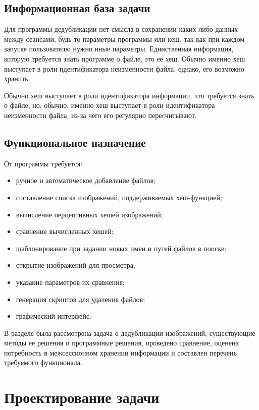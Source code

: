 \documentclass[variant=courcework]{bsuir}
\begin{document}

\section{Информационная база задачи}

Для программы дедубликации нет смысла в сохранении каких либо данных между
сеансами, будь то параметры программы или кеш, так как при каждом запуске
пользователю нужно иные параметры. Единственная информация, которую требуется
знать программе о файле, это ее хеш. Обычно именно хеш выступает в роли
идентификатора неизменности файла, однако, его возможно хранить

Обычно хеш выступает в роли идентификатора
информации,   что требуется знать о файле, но, обычно, именно хеш выступает в
роли идентификатора неизменности файла, из-за чего его регулярно пересчитывают.

\section{Функциональное назначение}

От программы требуется:

\begin{itemize}
    \item ручное и автоматическое добавление файлов;
    \item составление списка изображений, поддерживаемых хеш-функцией;
    \item вычисление перцептивных хешей изображений;
    \item сравнение вычисленных хешей;
    \item шаблонирование при задании новых имен и путей файлов в поиске;
    \item открытие изображений для просмотра;
    \item указание параметров их сравнения;
    \item генерация скриптов для удаления файлов;
    \item графический интерфейс.\\
\end{itemize}

В разделе была рассмотрена задача о дедубликации изображений, существующие
методы ее решения и программные решения, проведено сравнение, оценена
потребность в межсессионном хранении информации и составлен перечень требуемого
функционала. 

\chapter{Проектирование задачи}
\end{document}
